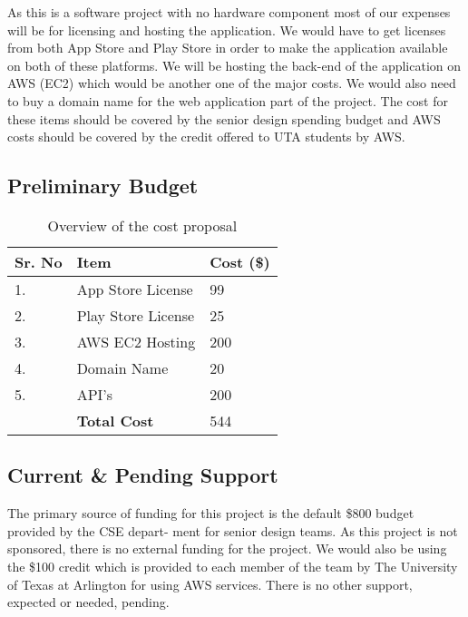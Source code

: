 As this is a software project with no hardware component most of our expenses will be for licensing and hosting the application. We would have to get licenses from both App Store and Play Store in order to make the application available on both of these platforms. We will be hosting the back-end of the application on AWS (EC2) which would be another one of the major costs. We would also need to buy a domain name for the web application part of the project. The cost for these items should be covered by the senior design spending budget and AWS costs should be covered by the credit offered to UTA students by AWS. 
 

\subsection{Preliminary Budget}
\begin{table}[h]
\centering

\begin{tabular}{|l|l|l|} 
\hline
Sr. No & Item               & Cost (\$)  \\ 
\hline
1.     & App Store License  & 99         \\ 
\hline
2.     & Play Store License & 25         \\ 
\hline
3.     & AWS EC2 Hosting    & 200        \\ 
\hline
4.     & Domain Name        & 20         \\ 
\hline
5.     & API's              & 200        \\
\hline
 & \textbf{Total Cost}              & 544        \\
\hline
\end{tabular}\caption{Overview of the cost proposal}
\end{table}

\subsection{Current \& Pending Support}
The primary source of funding for this project is the default \$800 budget provided by the CSE depart-
ment for senior design teams. As this project is not sponsored, there is no external funding for the
project. We would also be using the \$100 credit which is provided to each member of the team by The University of Texas at Arlington for using AWS services. There is no other support, expected or needed, pending.